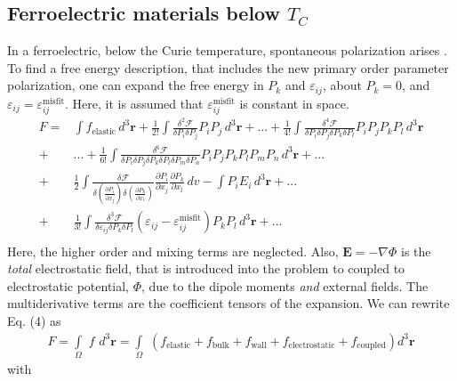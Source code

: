 \documentclass[16pt]{article} %
\begin{document}
\subsection{Ferroelectric materials below $T_C$}
%
In a ferroelectric, below the Curie temperature, spontaneous polarization arises \cite{LinesBook, RabeBook}.
%
To find a free energy description, that includes the new primary order parameter polarization, one can expand the free energy in $P_k$ and $\varepsilon_{ij}$, about $P_k = 0$, and $\varepsilon_{ij} =  \varepsilon_{ij}^\mathrm{misfit}$.
%
Here, it is assumed that $\varepsilon_{ij}^\mathrm{misfit}$ is constant in space. 
%
\begin{align}\tag{4}\label{eqn:Landau}\nonumber
F =&\int f_\mathrm{elastic} \,d^3 \textbf{r} + \frac{1}{2!}\int \frac{\delta^2 {\mathcal F}}{\delta P_i\delta P_j}P_i P_j\,d^3 \textbf{r}
+ ... + \frac{1}{4!}\int \frac{\delta^4 {\mathcal F}}{\delta P_i\delta P_j \delta P_k \delta P_l}
P_iP_jP_kP_l\, d^3 \textbf{r}\nonumber\\
+ &... +  \frac{1}{6!}\int \frac{\delta^6 {\mathcal F}}{\delta P_i\delta P_j \delta P_k \delta P_l\delta P_m \delta P_n}
P_iP_jP_kP_lP_m P_n\,d^3 \textbf{r} + ... \nonumber\\
+& \frac{1}{2}\int \frac{\delta {\mathcal F}}
{
\delta\left(\frac{\partial P_i}{\partial x_j}\right)
\delta\left(\frac{\partial P_k}{\partial x_l}\right)
}
\frac{\partial P_i}{\partial x_j}\frac{\partial P_k}{\partial x_l}\,dv-\int P_iE_i\,d^3 \textbf{r} + ...\nonumber\\
+& \frac{1}{3!}\int \frac{\delta^3 {\mathcal F}}{\delta \varepsilon_{ij}\delta P_k\delta P_l}
\left(\varepsilon_{ij}-\varepsilon_{ij}^\mathrm{misfit}\right)P_kP_l\,d^3 \textbf{r} +... \\ \nonumber
\end{align}\nonumber
%
Here, the higher order and mixing terms are neglected.
%
Also, ${\mathbf E} = - \nabla \Phi$ is the {\em total} electrostatic field, that is introduced into the problem to coupled to electrostatic potential, $\Phi$, due to the dipole moments \emph{and} external fields.
%
The multiderivative terms are the coefficient tensors of the expansion. We can rewrite Eq. (4) as
%
\begin{align}\tag{5}\label{eqn:Landau}
F = \int\limits_\Omega \,\, f \,\,d^3 \textbf{r} = \int\limits_\Omega \,\, \left( f_\mathrm{elastic} + f_\mathrm{bulk} + f_\mathrm{wall} + f_\mathrm{electrostatic} + f_\mathrm{coupled} \right) d^3 \textbf{r} 
\end{align}
%
with
\end{document}
